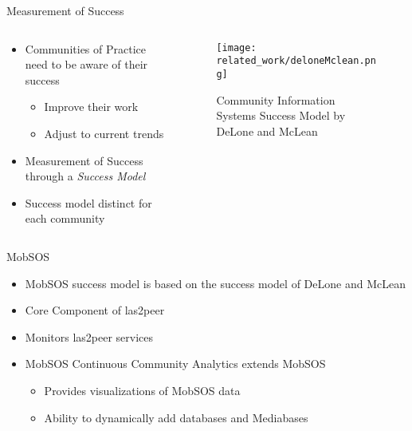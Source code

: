 \begin{frame}{Measurement of Success}
  \begin{columns}
    \begin{column}[]{0.3\textwidth}
      \begin{itemize}
        \item Communities of Practice need to be aware of their success
              \begin{itemize}
                \item Improve their work
                \item Adjust to current trends
              \end{itemize}
        \item Measurement of Success through a \emph{Success Model}
        \item Success model distinct for each community

      \end{itemize}
    \end{column}
    \begin{column}[]{0.7\textwidth}
      \begin{figure}
        \centering
        \texttt{[image: related\_work/deloneMclean.png]}
        \caption{Community Information Systems Success Model by DeLone and McLean \cite{DeMc92}}
      \end{figure}
    \end{column}
  \end{columns}
\end{frame}



\begin{frame}{MobSOS}

  \begin{itemize}
    \item MobSOS success model is based on the success model of DeLone and McLean
    \item Core Component of las2peer
    \item Monitors las2peer services
    \item MobSOS Continuous Community Analytics extends MobSOS
          \begin{itemize}
            \item Provides visualizations of MobSOS data
            \item Ability to dynamically add databases and Mediabases
          \end{itemize}
  \end{itemize}
\end{frame}

